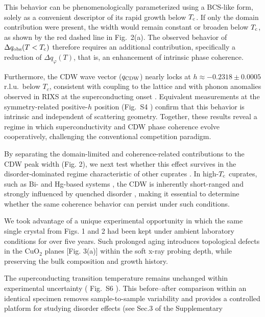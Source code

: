 \documentclass[floatfix,aps,twocolumn,preprintnumbers,superscriptaddress,floatfix,prl]{revtex4-2}
\begin{document}
This behavior can be phenomenologically parameterized using a BCS-like form, solely as a convenient descriptor of its rapid growth below $T_{\rm c}$. If only the domain contribution were present, the width would remain constant or broaden below $T_{\rm c}$, as shown by the red dashed line in Fig.~2(a). The observed behavior of $\Delta q_{\rm obs}(T<T_{\rm c})$ therefore requires an additional contribution, specifically a reduction of $\Delta q_{\varphi}(T)$, that is, an enhancement of intrinsic phase coherence.

Furthermore, the CDW wave vector ($q_{\rm CDW}$) nearly locks at $h \approx -0.2318 \pm 0.0005$ r.l.u.\ below $T_c$, consistent with coupling to the lattice and with phonon anomalies observed in RIXS at the superconducting onset \cite{Lee2,Arpaia1,Tacon1,Kim1,Reznik1,Pintschovius1,Devereaux1,Chaix1}. Equivalent measurements at the symmetry-related positive-$h$ position (Fig.~S4 \cite{supp}) confirm that this behavior is intrinsic and independent of scattering geometry. Together, these results reveal a regime in which superconductivity and CDW phase coherence evolve cooperatively, challenging the conventional competition paradigm.



By separating the domain-limited and coherence-related contributions to the CDW peak width (Fig. 2), we next test whether this effect survives in the disorder-dominated regime characteristic of other cuprates \cite{Kivelson1,Mesaros1,Hayward1,Nie1,Campi1,Jang1}. In high-$T_{\rm c}$ cuprates, such as Bi- and Hg-based systems \cite{Lee2,Tabis3}, the CDW is inherently short-ranged and strongly influenced by quenched disorder \cite{Hayward1,Nie1,Jang1}, making it essential to determine whether the same coherence behavior can persist under such conditions.

We took advantage of a unique experimental opportunity in which the same single crystal from Figs. 1 and 2 had been kept under ambient laboratory conditions for over five years. Such prolonged aging introduces topological defects in the CuO$_2$ planes [Fig. 3(a)] within the soft x-ray probing depth, while preserving the bulk composition and growth history.

The superconducting transition temperature remains unchanged within experimental uncertainty (
Fig.~S6 \cite{supp}).
This before–after comparison within an identical specimen removes sample-to-sample variability and provides a controlled platform for studying disorder effects (see Sec.3 of the Supplementary
\end{document}
